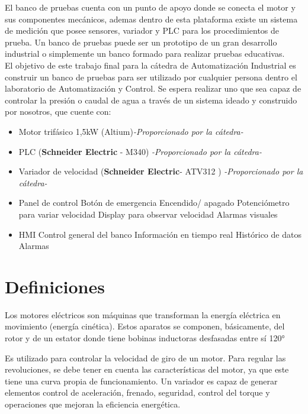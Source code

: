 El banco de pruebas cuenta con un punto de apoyo donde se conecta el motor y sus componentes mecánicos, ademas dentro de esta plataforma existe un sistema de medición que posee sensores, variador y PLC para los procedimientos de prueba.
Un banco de pruebas puede ser un prototipo de un gran desarrollo industrial o simplemente un banco formado para realizar pruebas educativas. \\

El objetivo de este trabajo final para la cátedra de Automatización Industrial es construir un banco de pruebas para ser utilizado por cualquier persona dentro el laboratorio de Automatización y Control. Se espera realizar uno que sea capaz de controlar la presión o caudal de agua a través de un sistema ideado y construido por nosotros, que cuente con:
\begin{itemize}
    \item Motor trifásico 1,5kW (Altium)\textit{-Proporcionado por la cátedra-}
    \item PLC (\textbf{Schneider Electric} - M340) \textit{-Proporcionado por la cátedra-}
    \item Variador de velocidad (\textbf{Schneider Electric}- ATV312 ) \textit{-Proporcionado por la cátedra-}
    \item Panel de control
        \subitem Botón de emergencia
        \subitem Encendido/ apagado
        \subitem Potenciómetro para variar velocidad
        \subitem Display para observar velocidad
        \subitem Alarmas visuales
    \item HMI
        \subitem Control general del banco
        \subitem Información en tiempo real
        \subitem Histórico de datos
        \subitem Alarmas
\end{itemize}


\newpage

\section{Definiciones}
\begin{tcolorbox}[colback=blue!5!white,colframe=blue!75!black,title=Motor eléctrico]
	Los motores eléctricos son máquinas que transforman la energía eléctrica en movimiento (energía cinética). Estos aparatos se componen, básicamente, del rotor y de un estator donde tiene bobinas inductoras desfasadas entre sí 120°
\end{tcolorbox}

\begin{tcolorbox}[colback=blue!5!white,colframe=blue!75!black,title=Variador de velocidad]
	Es utilizado para controlar la velocidad de giro de un motor.
	Para regular las revoluciones, se debe tener en cuenta las características del motor, ya que este tiene una curva propia de funcionamiento. Un variador es capaz de generar elementos control de aceleración, frenado, seguridad, control del torque y operaciones que mejoran la eficiencia energética.
\end{tcolorbox}

